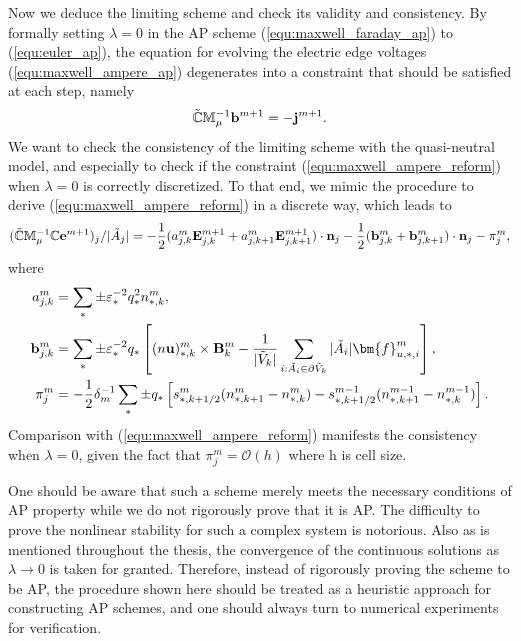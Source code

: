 \documentclass{article}
\begin{document}
Now we deduce the limiting scheme and check its validity and consistency. By formally setting $\lambda = 0$ in the AP scheme (\ref{equ:maxwell_faraday_ap}) to (\ref{equ:euler_ap}), the equation for evolving the electric edge voltages (\ref{equ:maxwell_ampere_ap}) degenerates into a constraint that should be satisfied at each step, namely
\begin{equation*}
     \Tilde{\mathbb{C}}\mathbb{M}_\mu^{-1}\mathbf{b}^{m+1} = - \mathbf{j}^{m+1}.
\end{equation*}
We want to check the consistency of the limiting scheme with the quasi-neutral model, and especially to check if the constraint (\ref{equ:maxwell_ampere_reform}) when $\lambda = 0$ is correctly discretized. To that end, we mimic the procedure to derive (\ref{equ:maxwell_ampere_reform}) in a discrete way, which leads to
\begin{equation*}
    (\Tilde{\mathbb{C}}\mathbb{M}_\mu^{-1}\mathbb{C}\mathbf{e}^{m+1})_j / |\Tilde{A}_j| = - \frac{1}{2}(a_{j,k}^m\mathbf{E}^{m+1}_{j,k} + a_{j,k+1}^m\mathbf{E}^{m+1}_{j,k+1})\cdot \mathbf{n}_j - \frac{1}{2}(\mathbf{b}_{j,k}^m + \mathbf{b}_{j, k+1}^m) \cdot \mathbf{n}_j - \pi_j^m,
\end{equation*}
where
\begin{align*}
    a_{j,k}^m &= \sum_*\pm\varepsilon_*^{-2}q_*^2n^m_{*,k}, \\
    \mathbf{b}_{j,k}^m &= \sum_*\pm\varepsilon_*^{-2}q_*\left[(n\mathbf{u})^m_{*,k}\times\mathbf{B}^m_k - \frac{1}{|\Tilde{V}_k|}\sum_{i:\Tilde{A}_i\in\partial\Tilde{V}_k}|\Tilde{A}_i|\bm{f}_{u,*,i}^m\right], \\
    \pi^m_j &= - \frac{1}{2} \delta_m^{-1} \sum_* \pm q_* \left[s_{*,k+1/2}^m(n^m_{*,k+1} - n^m_{*,k}) - s^{m-1}_{*,k+1/2}(n^{m-1}_{*,k+1} - n^{m-1}_{*,k})\right].
\end{align*}
Comparison with (\ref{equ:maxwell_ampere_reform}) manifests the consistency when $\lambda = 0$, given the fact that $\pi^m_j = \mathcal{O}(h)$ where h is cell size.

One should be aware that such a scheme merely meets the necessary conditions of AP property while we do not rigorously prove that it is AP. The difficulty to prove the nonlinear stability for such a complex system is notorious. Also as is mentioned throughout the thesis, the convergence of the continuous solutions as $\lambda \rightarrow 0$ is taken for granted. Therefore, instead of rigorously proving the scheme to be AP, the procedure shown here should be treated as a heuristic approach for constructing AP schemes, and one should always turn to numerical experiments for verification. 
\end{document}
